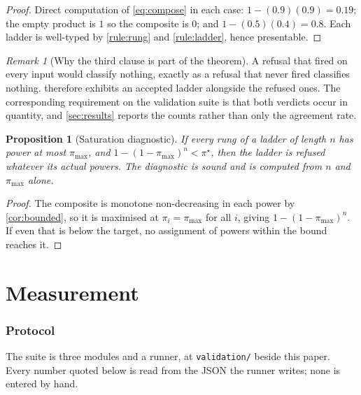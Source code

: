 \documentclass[11pt,twocolumn,a4paper]{article}
\theoremstyle{plain}
\newtheorem{proposition}[theorem]{Proposition}
\theoremstyle{definition}
\theoremstyle{remark}
\newtheorem{remark}[theorem]{Remark}
\newcommand{\pow}{\pi}
\begin{document}
\begin{proof}
Direct computation of \cref{eq:compose} in each case: $1-(0.9)(0.9)=0.19$;
the empty product is $1$ so the composite is $0$; and
$1-(0.5)(0.4)=0.8$. Each ladder is well-typed by \cref{rule:rung} and
\cref{rule:ladder}, hence presentable.
\end{proof}

\begin{remark}[Why the third clause is part of the theorem]
\label{rem:both-directions}
A refusal that fired on every input would classify nothing, exactly as a
refusal that never fired classifies nothing.  therefore
exhibits an accepted ladder alongside the refused ones. The corresponding
requirement on the validation suite is that both verdicts occur in quantity,
and \cref{sec:results} reports the counts rather than only the agreement rate.
\end{remark}

\begin{proposition}[Saturation diagnostic]
\label{prop:saturation}
If every rung of a ladder of length $n$ has power at most $\pow_{\max}$, and
$1-(1-\pow_{\max})^n<\pow^\star$, then the ladder is refused whatever its
actual powers. The diagnostic is sound and is computed from $n$ and
$\pow_{\max}$ alone.
\end{proposition}

\begin{proof}
The composite is monotone non-decreasing in each power by
\cref{cor:bounded}, so it is maximised at $\pow_i=\pow_{\max}$ for all $i$,
giving $1-(1-\pow_{\max})^n$. If even that is below the target, no assignment
of powers within the bound reaches it.
\end{proof}

\part{Measurement}
\label{part:measurement}

\section{Protocol}
\label{sec:protocol}

The suite is three modules and a runner, at
\texttt{validation/} beside this paper. Every number quoted below is read from
the JSON the runner writes; none is entered by hand.
\end{document}
